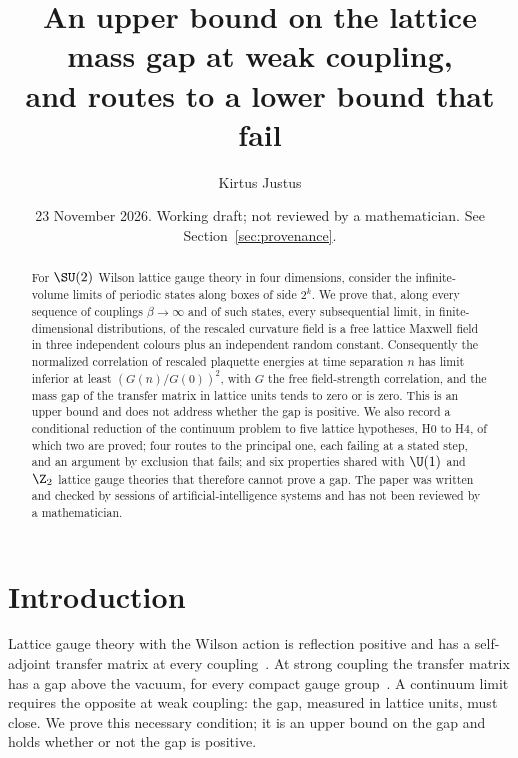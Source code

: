 
\title[An upper bound on the lattice mass gap at weak coupling]{An upper bound on the lattice mass gap at weak coupling,\\ and routes to a lower bound that fail}
\author{Kirtus Justus}
\address{Theoretical Physicist, Port Coquitlam, British Columbia, Canada}
\date{23 November 2026. Working draft; not reviewed by a mathematician. See Section~\ref{sec:provenance}.}

\begin{abstract}
For $\SU(2)$ Wilson lattice gauge theory in four dimensions, consider the infinite-volume limits of periodic states along boxes of side $2^k$. We prove that, along every sequence of couplings $\beta\to\infty$ and of such states, every subsequential limit, in finite-dimensional distributions, of the rescaled curvature field is a free lattice Maxwell field in three independent colours plus an independent random constant. Consequently the normalized correlation of rescaled plaquette energies at time separation $n$ has limit inferior at least $(G(n)/G(0))^2$, with $G$ the free field-strength correlation, and the mass gap of the transfer matrix in lattice units tends to zero or is zero. This is an upper bound and does not address whether the gap is positive. We also record a conditional reduction of the continuum problem to five lattice hypotheses, H0 to H4, of which two are proved; four routes to the principal one, each failing at a stated step, and an argument by exclusion that fails; and six properties shared with $\U(1)$ and $\Z_2$ lattice gauge theories that therefore cannot prove a gap. The paper was written and checked by sessions of artificial-intelligence systems and has not been reviewed by a mathematician.
\end{abstract}
\maketitle

\section{Introduction}\label{sec:intro}

Lattice gauge theory with the Wilson action is reflection positive and has a self-adjoint transfer matrix at every coupling~\cite{OS78,Lu77}. At strong coupling the transfer matrix has a gap above the vacuum, for every compact gauge group~\cite{OS78}. A continuum limit requires the opposite at weak coupling: the gap, measured in lattice units, must close. We prove this necessary condition; it is an upper bound on the gap and holds whether or not the gap is positive.

